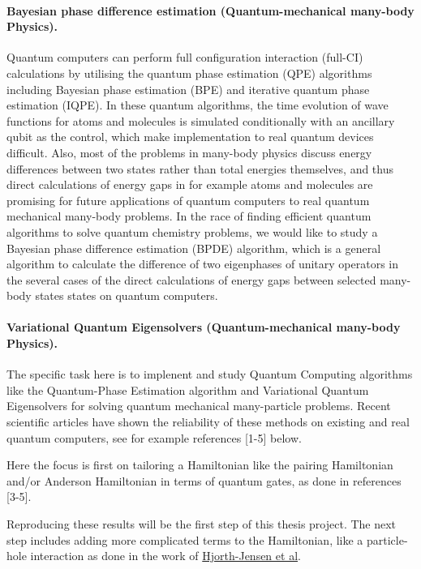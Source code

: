 \documentclass[%
oneside,                 %
final,                   %
10pt]{article}
\begin{document}
\noindent
\paragraph{Bayesian phase difference estimation (Quantum-mechanical many-body Physics).}
Quantum computers can perform full configuration interaction (full-CI)
calculations by utilising the quantum phase estimation (QPE)
algorithms including Bayesian phase estimation (BPE) and iterative
quantum phase estimation (IQPE). In these quantum algorithms, the time
evolution of wave functions for atoms and molecules is simulated
conditionally with an ancillary qubit as the control, which make
implementation to real quantum devices difficult. Also, most of the
problems in many-body physics discuss energy differences between two
states rather than total energies themselves, and thus
direct calculations of energy gaps in for example atoms and molecules are promising for future
applications of quantum computers to real quantum mechanical many-body problems. In the
race of finding efficient quantum algorithms to solve quantum
chemistry problems, we would like to study  a Bayesian phase difference estimation
(BPDE) algorithm, which is a general algorithm to calculate the
difference of two eigenphases of unitary operators in the several
cases of the direct calculations of energy gaps between selected many-body states
states on quantum computers.

\paragraph{Variational Quantum Eigensolvers (Quantum-mechanical many-body Physics).}
The specific task here is to implenent and study Quantum Computing
algorithms like the Quantum-Phase Estimation algorithm and Variational
Quantum Eigensolvers for solving quantum mechanical many-particle
problems.  Recent scientific articles have shown the reliability of
these methods on existing and real quantum computers, see for example
references [1-5] below.

Here the focus is first on tailoring a Hamiltonian like the pairing
Hamiltonian and/or Anderson Hamiltonian in terms of quantum gates, as
done in references [3-5].

Reproducing these results will be the first step of this thesis
project. The next step includes adding more complicated terms to the
Hamiltonian, like a particle-hole interaction as done in the work of
\href{{http://iopscience.iop.org/article/10.1088/0954-3899/37/6/064035/meta}}{Hjorth-Jensen et
al}.
\end{document}
